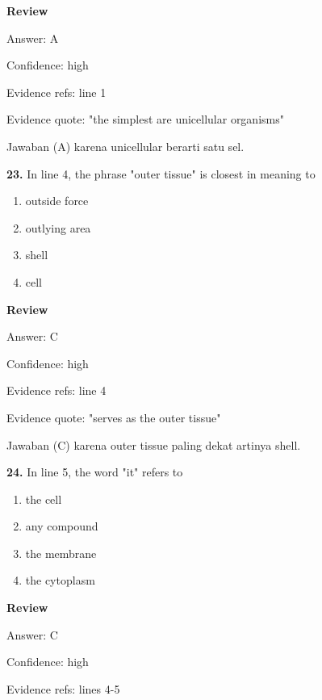 \documentclass[12pt]{article}
\begin{document}
\par
\begingroup
\setlength{\parskip}{0pt}
\setlength{\parindent}{0pt}
\textbf{Review}\par
Answer: A\par
Confidence: high\par
Evidence refs: line 1\par
Evidence quote: "the simplest are unicellular organisms"\par
Jawaban (A) karena unicellular berarti satu sel.\par
\endgroup
\par
\vspace{0.25\baselineskip}
\noindent\textbf{23.} In line 4, the phrase "outer tissue" is closest in meaning to
\begin{enumerate}[label=(\Alph*),leftmargin=*,itemsep=0.2em]
\item outside force
\item outlying area
\item shell
\item cell
\end{enumerate}
\par
\begingroup
\setlength{\parskip}{0pt}
\setlength{\parindent}{0pt}
\textbf{Review}\par
Answer: C\par
Confidence: high\par
Evidence refs: line 4\par
Evidence quote: "serves as the outer tissue"\par
Jawaban (C) karena outer tissue paling dekat artinya shell.\par
\endgroup
\par
\vspace{0.25\baselineskip}
\noindent\textbf{24.} In line 5, the word "it" refers to
\begin{enumerate}[label=(\Alph*),leftmargin=*,itemsep=0.2em]
\item the cell
\item any compound
\item the membrane
\item the cytoplasm
\end{enumerate}
\par
\begingroup
\setlength{\parskip}{0pt}
\setlength{\parindent}{0pt}
\textbf{Review}\par
Answer: C\par
Confidence: high\par
Evidence refs: lines 4-5\par
\end{document}

